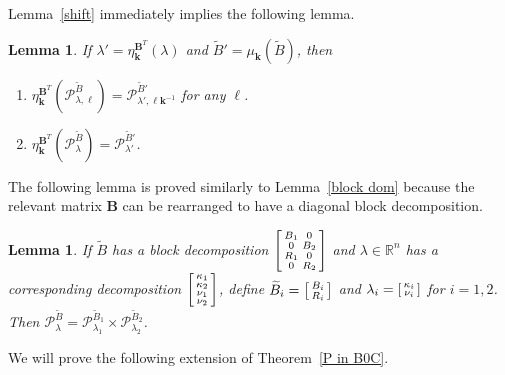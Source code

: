 \documentclass{amsart}
\newtheorem{lemma}[proposition]{Lemma}
\theoremstyle{definition}
\theoremstyle{remark}
\numberwithin{equation}{section}
\newcommand{\reals}{\mathbb R}
\newcommand{\0}{{\mathbf{0}}}
\newcommand{\kk}{{\boldsymbol{k}}}
\renewcommand{\ll}{{\boldsymbol\ell}}
\newcommand{\tB}{{\widetilde{B}}}
\newcommand{\BB}{\mathbf{B}}
\newcommand{\R}{\mathcal{R}}
\renewcommand{\P}{\mathcal{P}}
\begin{document}
Lemma~\ref{shift} immediately implies the following lemma.
\begin{lemma}\label{shift extended}
If $\lambda'=\eta_\kk^{\BB^T}(\lambda)$ and $\tB'=\mu_\kk(\tB)$, then 
\begin{enumerate}[label=\bf\arabic*., ref=\arabic*]
\item \label{shift extended one}
$\eta^{\BB^T}_\kk\!\!(\P^\tB_{\lambda,\ll})=\P^{\tB'}_{\lambda',\ll\kk^{-1}}$ for any $\ll$.
\item \label{shift extended all}
$\eta^{\BB^T}_\kk\!\!(\P^\tB_\lambda)=\P^{\tB'}_{\lambda'}$.
\end{enumerate}
\end{lemma}

The following lemma is proved similarly to Lemma~\ref{block dom} because the relevant matrix $\BB$ can be rearranged to have a diagonal block decomposition.

\begin{lemma}\label{block dom ext}
If $\tB$ has a block decomposition $\begin{bsmallmatrix}B_1&0\\0&B_2\\R_1&0\\0&R_2\end{bsmallmatrix}$ and $\lambda\in\reals^n$ has a corresponding decomposition $\begin{bsmallmatrix}\kappa_1\\\kappa_2\\\nu_1\\\nu_2\end{bsmallmatrix}$, define $\tB_i=\begin{bsmallmatrix}B_i\\R_i\end{bsmallmatrix}$ and $\lambda_i=\begin{bsmallmatrix}\kappa_i\\\nu_i\end{bsmallmatrix}$ for $i=1,2$.
Then $\P_\lambda^\tB=\P_{\lambda_1}^{\tB_1}\times\P_{\lambda_2}^{\tB_2}$.
\end{lemma}

We will prove the following extension of Theorem~\ref{P in B0C}.
\end{document}
